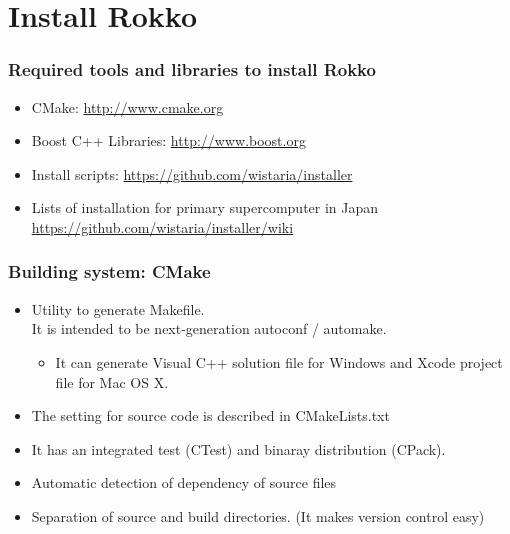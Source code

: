 \section{Install Rokko}

\begin{frame}
  \frametitle{Required tools and libraries to install Rokko}
  \begin{itemize}
    \setlength{\itemsep}{1em}
  \item CMake: \url{http://www.cmake.org}
  \item Boost C++ Libraries: \url{http://www.boost.org}
  \item Install scripts: \url{https://github.com/wistaria/installer}
  \item Lists of installation for primary supercomputer in Japan \\
    \url{https://github.com/wistaria/installer/wiki}
  \end{itemize}
\end{frame}


\begin{frame}
  \frametitle{Building system: CMake}
  \begin{itemize}
    \setlength{\itemsep}{1em}
  \item Utility to generate Makefile.\\
  It is intended to be next-generation autoconf / automake.
    \begin{itemize}
    \item It can generate Visual C++ solution file for Windows and Xcode project file for Mac OS X.
    \end{itemize}
  \item The setting for source code is described in CMakeLists.txt
  \item It has an integrated test (CTest) and binaray distribution (CPack).
  \item Automatic detection of dependency of source files
  \item Separation of source and build directories. (It makes version control easy)
  \end{itemize}
\end{frame}


